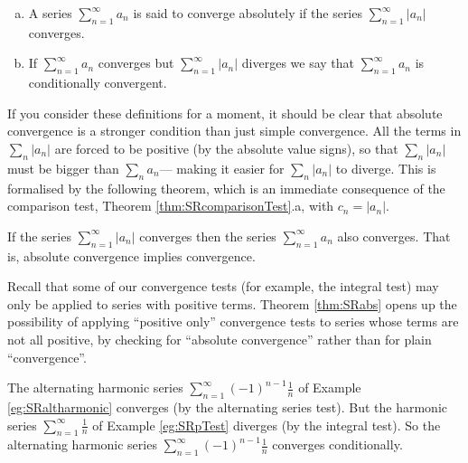 \begin{defn}\label{def:SRabsCond}
\begin{enumerate}[(a)]
\item A series $\sum\limits_{n=1}^\infty a_n$ is said to converge absolutely
if the series $\sum\limits_{n=1}^\infty |a_n|$ converges.
\item If $\sum\limits_{n=1}^\infty a_n$ converges but
$\sum\limits_{n=1}^\infty |a_n|$
diverges we say that $\sum\limits_{n=1}^\infty a_n$ is conditionally convergent.
\end{enumerate}
\end{defn}
If you consider these definitions for a moment, it should be clear
that absolute convergence is a stronger condition than just simple
convergence. All the terms in $\sum_n |a_n|$ are
forced to be positive (by the absolute value signs), so that
$\sum_n |a_n|$ must be bigger than
$\sum_n a_n$--- making it easier for
$\sum_n |a_n|$ to diverge. This is formalised
by the following theorem, which is an immediate consequence
of the comparison test, Theorem \ref{thm:SRcomparisonTest}.a,
with $c_n=|a_n|$.


\begin{theorem}\label{thm:SRabs}
If the series $\sum\limits_{n=1}^\infty |a_n|$ converges then the
series $\sum\limits_{n=1}^\infty a_n$ also converges. That is,
absolute convergence implies convergence.
\end{theorem}

Recall that some of our convergence tests (for example, the integral test) may only be applied to series with positive
terms. Theorem \ref{thm:SRabs} opens up the possibility of applying ``positive only'' convergence tests to series whose
terms are not all positive, by checking for ``absolute convergence'' rather than for plain ``convergence''.

\begin{eg}[$\sum_{n=1}^\infty(-1)^{n-1}\frac{1}{n}$]\label{eg:SRabsCond}
The alternating harmonic series $\sum\limits_{n=1}^\infty(-1)^{n-1}\frac{1}{n}$
of Example \ref{eg:SRaltharmonic} converges (by the alternating series
test). But the harmonic series $\sum\limits_{n=1}^\infty\frac{1}{n}$
of Example \ref{eg:SRpTest} diverges (by the integral test). So
the alternating harmonic series $\sum\limits_{n=1}^\infty(-1)^{n-1}\frac{1}{n}$
converges conditionally.

\end{eg}


